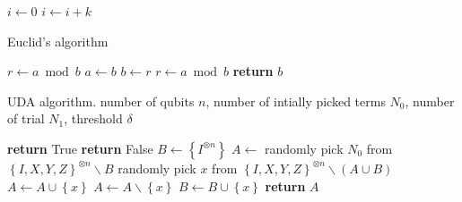 \documentclass[%
 reprint,
 amsmath,amssymb,
 aps,
]{revtex4-2}
\begin{document}
\begin{algorithmic}
    \State $i\gets 0$
\Else
        \State $i\gets i+k$
    \EndIf
\EndIf
\end{algorithmic}

\begin{algorithm}[H]
\caption{Euclid’s algorithm}\label{euclid}
\begin{algorithmic}[1]
    \State $r\gets a\bmod b$
        \State $a\gets b$
        \State $b\gets r$
        \State $r\gets a\bmod b$
    \EndWhile\label{euclidendwhile}
    \State \textbf{return} $b$
\EndProcedure
\end{algorithmic}
\end{algorithm}

\begin{algorithm}
\caption{UDA algorithm. number of qubits $n$, number of intially picked terms $N_0$, number of trial $N_1$, threshold $\delta$}
\begin{algorithmic}[1]
        \State \textbf{return} True
    \Else
        \State \textbf{return} False
    \EndIf
\EndProcedure
{}
    \State $B\gets \left\{I^{\otimes n}\right\}$
    \Repeat
        \State $A\gets$ randomly pick $N_0$ from $\left\{I,X,Y,Z\right\}^{\otimes n} \backslash B$
        \State randomly pick $x$ from $\left\{ I,X,Y,Z \right\} ^{\otimes n}\backslash(A\cup B)$
        \State $A\gets A\cup \left\{x\right\}$
            \State $A\gets A \backslash \left\{x\right\}$
            \State $B\gets B\cup \left\{x\right\}$
        \EndIf
    \EndWhile
    \State \textbf{return} $A$
\EndProcedure
\end{algorithmic}
\end{algorithm}


\end{document}
